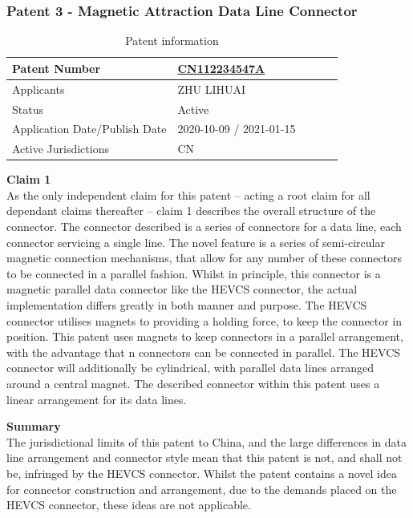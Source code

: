 \documentclass [12pt]{article}
\begin{document}
\subsubsection{Patent 3 - Magnetic Attraction Data Line Connector}
\begin{table}[H]
    \centering
    \setlength{\arrayrulewidth}{1.5pt}
    \begin{tabular}{|p{0.5\linewidth}|p{0.5\linewidth}|}
    \hline
    Patent Number & \href{https://worldwide.espacenet.com/patent/search/family/074120319/publication/CN112234547A?q=CN112234547A}{CN112234547A}\\
    \hline
    Applicants &ZHU LIHUAI\\
    \hline
    Status & Active\\
    \hline
    Application Date/Publish Date & 2020-10-09 / 2021-01-15\\
    \hline
    Active Jurisdictions & CN\\
    \hline
    \end{tabular}
    \caption{Patent information}
    \label{table:mag_con3}
\end{table}
\textbf{Claim 1}\\
As the only independent claim for this patent – acting a root claim for all dependant claims thereafter – claim 1 describes the overall structure of the connector. The connector described is a series of connectors for a data line, each connector servicing a single line. The novel feature is a series of semi-circular magnetic connection mechanisms, that allow for any number of these connectors to be connected in a parallel fashion.
Whilst in principle, this connector is a magnetic parallel data connector like the HEVCS connector, the actual implementation differs greatly in both manner and purpose. The HEVCS connector utilises magnets to providing a holding force, to keep the connector in position. This patent uses magnets to keep connectors in a parallel arrangement, with the advantage that n connectors can be connected in parallel.
The HEVCS connector will additionally be cylindrical, with parallel data lines arranged around a central magnet. The described connector within this patent uses a linear arrangement for its data lines.

\textbf{Summary}\\
The jurisdictional limits of this patent to China, and the large differences in data line arrangement and connector style mean that this patent is not, and shall not be, infringed by the HEVCS connector. Whilst the patent contains a novel idea for connector construction and arrangement, due to the demands placed on the HEVCS connector, these ideas are not applicable.
\end{document}
